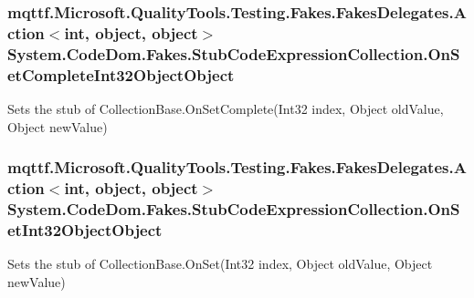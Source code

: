 \hypertarget{class_system_1_1_code_dom_1_1_fakes_1_1_stub_code_expression_collection_af83b62772d292db891790ea46ce3a590}{
\subsubsection[{On\-Set\-Complete\-Int32\-Object\-Object}]{\setlength{\rightskip}{0pt plus 5cm}mqttf.\-Microsoft.\-Quality\-Tools.\-Testing.\-Fakes.\-Fakes\-Delegates.\-Action$<$int, object, object$>$ System.\-Code\-Dom.\-Fakes.\-Stub\-Code\-Expression\-Collection.\-On\-Set\-Complete\-Int32\-Object\-Object}}\label{class_system_1_1_code_dom_1_1_fakes_1_1_stub_code_expression_collection_af83b62772d292db891790ea46ce3a590}


Sets the stub of Collection\-Base.\-On\-Set\-Complete(\-Int32 index, Object old\-Value, Object new\-Value)

\hypertarget{class_system_1_1_code_dom_1_1_fakes_1_1_stub_code_expression_collection_a74ab3323b37ae3ef6ed967138675beb4}{
\subsubsection[{On\-Set\-Int32\-Object\-Object}]{\setlength{\rightskip}{0pt plus 5cm}mqttf.\-Microsoft.\-Quality\-Tools.\-Testing.\-Fakes.\-Fakes\-Delegates.\-Action$<$int, object, object$>$ System.\-Code\-Dom.\-Fakes.\-Stub\-Code\-Expression\-Collection.\-On\-Set\-Int32\-Object\-Object}}\label{class_system_1_1_code_dom_1_1_fakes_1_1_stub_code_expression_collection_a74ab3323b37ae3ef6ed967138675beb4}


Sets the stub of Collection\-Base.\-On\-Set(\-Int32 index, Object old\-Value, Object new\-Value)

